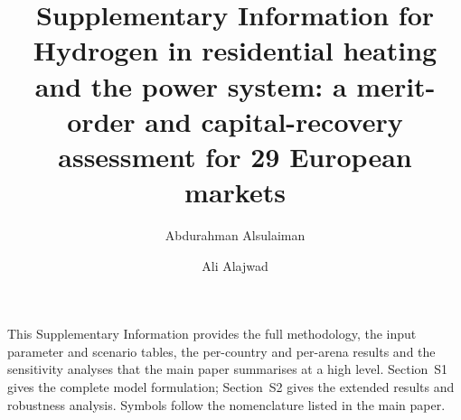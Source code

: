 \documentclass[11pt]{article}
\title{Supplementary Information for\\[4pt]
\large Hydrogen in residential heating and the power system: a merit-order and
capital-recovery assessment for 29 European markets}
\author{Abdurahman Alsulaiman \and Ali Alajwad}
\date{}
\begin{document}
\maketitle

\noindent This Supplementary Information provides the full methodology, the input
parameter and scenario tables, the per-country and per-arena results and the
sensitivity analyses that the main paper summarises at a high level. Section~S1
gives the complete model formulation; Section~S2 gives the extended results and
robustness analysis. Symbols follow the nomenclature listed in the main paper.

\tableofcontents
\bigskip


\clearpage




\end{document}
